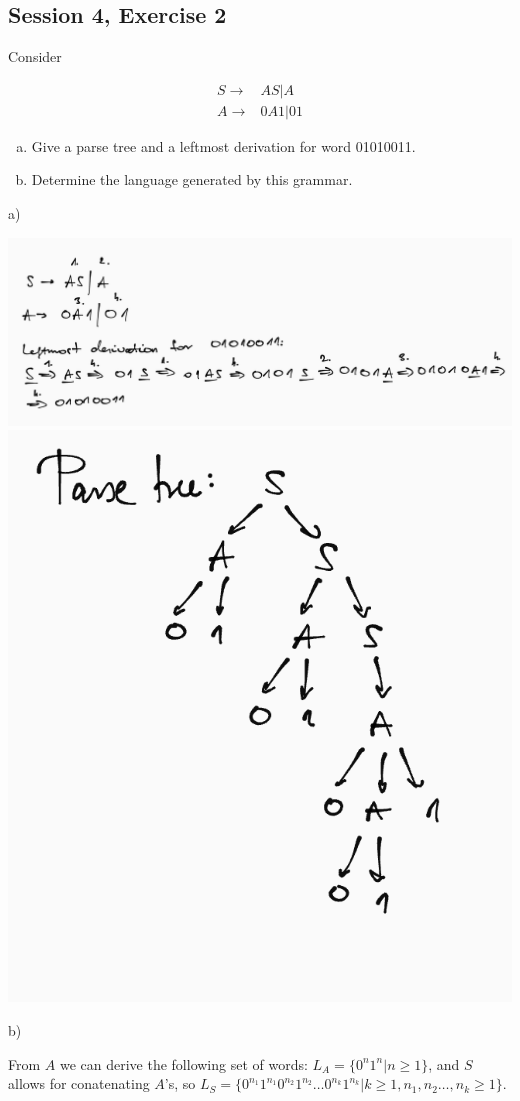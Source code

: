 \subsection{Session 4, Exercise 2}


Consider

\begin{align*}
S \rightarrow& AS|A\\
A \rightarrow& 0A1|01
\end{align*}

\begin{enumerate}[(a)]
\item Give a parse tree and a leftmost derivation for word 01010011.
\item Determine the language generated by this grammar.
\end{enumerate}


a)

\includegraphics[width=\linewidth]{04/4_2_a_1.png}
\includegraphics[width=\linewidth]{04/4_2_a_2.png}

b)

From $A$ we can derive the following set of words: $L_A = \{0^n1^n | n\geq{}1\}$, and $S$ allows for conatenating $A$'s, so $L_S=\{0^{n_1}1^{n_1}0^{n_2}1^{n_2}\dots0^{n_k}1^{n_k} | k\geq{}1, n_1,n_2\dots,n_k\geq{}1\}$.